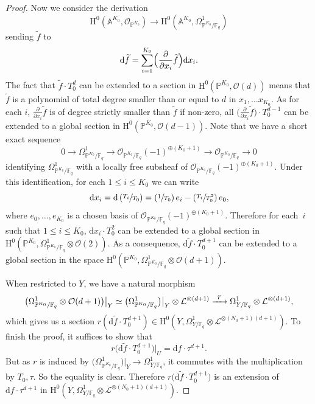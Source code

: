 \documentclass[11pt]{article}
\numberwithin{equation}{section}
\newcommand{\To}[1]{\mathchoice{\xrightarrow{\textstyle\kern4pt#1\kern3pt}}{\stackrel{#1}{\longrightarrow}}{}{}}
\newcommand{\Psfrac}[2]{(\sfrac{#1}{#2})}
\theoremstyle{plain}
\theoremstyle{definition}
\newcommand{\ho}{\mathrm{H}}
\newcommand{\li}{\mathcal{L}}
\newcommand{\A}{\mathbb{A}}
\newcommand{\pr}{\mathbb{P}}
\newcommand{\F}{\mathbb{F}}
\begin{document}
\begin{proof}[Proof]
Now we consider the derivation
\[
\ho^0(\A^{K_0},\mathcal{O}_{\pr^{K_0}}) \to \ho^0(\A^{K_0},\Omega_{\pr^{K_0}/\F_q}^1)
\]
sending $\widetilde{f}$ to
\[
\mathrm{d}\widetilde{f}=\sum_{i=1}^{K_0}\Bigl(\frac{\partial}{\partial x_i}\widetilde{f}\Bigr) \mathrm{d}x_i.
\]
The fact that $\widetilde{f}\cdot T_0^d$ can be extended to a section in $\ho^0(\pr^{K_0},\mathcal{O}(d))$ means that $\widetilde{f}$ is a polynomial of total degree smaller than or equal to $d$ in $x_1,\dots x_{K_0}$. As for each $i$, $\frac{\partial}{\partial x_i}\widetilde{f}$ is of degree strictly smaller than $\widetilde{f}$ if non-zero, all $\bigl(\frac{\partial}{\partial x_i}\widetilde{f}\bigr)\cdot T_0^{d-1}$ can be extended to a global section in $\ho^0(\pr^{K_0},\mathcal{O}(d-1))$. Note that we have a short exact sequence
\[
0\to \Omega_{\pr^{K_0}/\F_q}^1 \to \mathcal{O}_{\pr^{K_0}/\F_q}(-1)^{\oplus (K_0+1)} \to \mathcal{O}_{\pr^{K_0}/\F_q} \to 0
\]
identifying $\Omega_{\pr^{K_0}/\F_q}^1$ with a locally free subsheaf of $\mathcal{O}_{\pr^{K_0}/\F_q}(-1)^{\oplus (K_0+1)}$. Under this identification, for each $1\leq i\leq K_0$ we can write
\[
\mathrm{d}x_i=\mathrm{d} \left(\sfrac{T_i}{T_0} \right)=\Psfrac{1}{T_0}\,e_i-\Psfrac{T_i}{T_0^2}\,e_0,
\]
where $e_0,\dots, e_{K_0}$ is a chosen basis of $ \mathcal{O}_{\pr^{K_0}/\F_q}(-1)^{\oplus (K_0+1)} $. Therefore for each~$i$ such that $1\!\leq\! i\!\leq\! K_0$, $\mathrm{d} x_i\cdot T_0^2$ can be extended to a global section in \hbox{$\ho^0(\pr^{K_0},\Omega_{\pr^{K_0}/\F_q}^1\!\otimes\!\mathcal{O}(2))$}. As a consequence, $\mathrm{d}\widetilde{f}\cdot T_0^{d+1}$ can be extended to a global section in the space \hbox{$\ho^0(\pr^{K_0},\Omega_{\pr^{K_0}/\F_q}^1\otimes \mathcal{O}(d+1))$}.

When restricted to $Y$, we have a natural morphism
\[
\bigl(\Omega_{\pr^{K_0}/\F_q}^1\otimes \mathcal{O}(d+1)\bigr)\big|_Y\simeq \bigl(\Omega_{\pr^{K_0}/\F_q}^1\bigr)\big|_Y\otimes \li^{\otimes(d+1)}\To{r} \Omega_{Y/\F_q}^1\otimes \li^{\otimes(d+1)},
\]
which gives us a section $r(\mathrm{d}\widetilde{f}\cdot T_0^{d+1})\in \ho^0(Y, \Omega_{Y/\F_q}^1\otimes \li^{\otimes(N_0+1)(d+1)})$. To finish the proof, it suffices to show that
\[
r\bigl(\mathrm{d}\widetilde{f}\cdot T_0^{d+1}\bigr)\big|_U=\mathrm{d}f\cdot \tau^{d+1}.
\]
But as $r$ is induced by $\bigl(\Omega_{\pr^{K_0}/\F_q}^1\bigr)\big|_Y\to \Omega_{Y/\F_q}^1$, it commutes with the multiplication by $T_0, \tau$. So the equality is clear. Therefore $r\bigl(\mathrm{d}\widetilde{f}\cdot T_0^{d+1}\bigr)$ is an extension of $\mathrm{d}f\cdot \tau^{d+1}$ in $\ho^0(Y, \Omega_{Y/\F_q}^1\otimes \li^{\otimes(N_0+1)(d+1)})$.
\end{proof}
\end{document}

